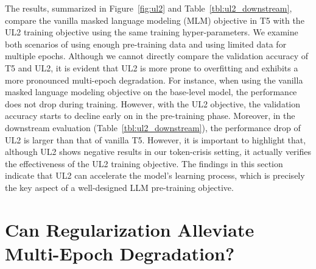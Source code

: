 \documentclass{article}
\begin{document}
The results, summarized in Figure~\ref{fig:ul2} and Table~\ref{tbl:ul2_downstream}, compare the vanilla masked language modeling (MLM) objective in T5 with the UL2 training objective using the same training hyper-parameters. We examine both scenarios of using enough pre-training data and using limited data for multiple epochs. Although we cannot directly compare the validation accuracy of T5 and UL2, it is evident that UL2 is more prone to overfitting and exhibits a more pronounced multi-epoch degradation. For instance, when using the vanilla masked language modeling objective on the base-level model, the performance does not drop during training. However, with the UL2 objective, the validation accuracy starts to decline early on in the pre-training phase. Moreover, in the downstream evaluation (Table~\ref{tbl:ul2_downstream}), the performance drop of UL2 is larger than that of vanilla T5. However, it is important to highlight that, although UL2 shows negative results in our token-crisis setting, it actually verifies the effectiveness of the UL2 training objective. The findings in this section indicate that UL2 can accelerate the model's learning process, which is precisely the key aspect of a well-designed LLM pre-training objective.




\section{Can Regularization Alleviate Multi-Epoch Degradation?}\label{sec:tricks}
\end{document}
